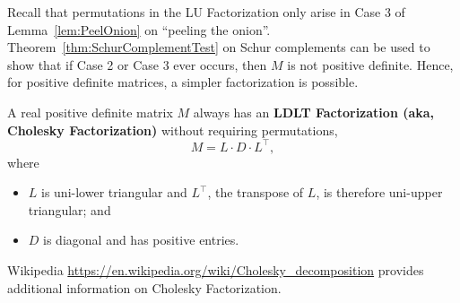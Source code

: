 \begin{rem} Recall that permutations in the LU Factorization only arise in Case 3 of Lemma~\ref{lem:PeelOnion} on ``peeling the onion''. Theorem~\ref{thm:SchurComplementTest} on Schur complements can be used to show that if Case 2 or Case 3 ever occurs, then $M$ is not positive definite. Hence, for positive definite matrices, a simpler factorization is possible. 
\end{rem}

\begin{tcolorbox}[title=\textbf{ \large Factorization of Positive Definite Matrices}]
A real positive definite matrix $M$ always has an \textbf{LDLT Factorization (aka, Cholesky Factorization)} without requiring permutations,
\begin{equation}
    \label{eq:LDLTfactorization}
   M  = L\cdot D \cdot L^\top,
\end{equation}
where
\begin{itemize}
    \item $L$ is uni-lower triangular and $L^\top$, the transpose of $L$, is therefore uni-upper triangular; and
    \item $D$ is diagonal and has positive entries.
\end{itemize}

\end{tcolorbox}

\vspace*{.2cm}
Wikipedia \url{https://en.wikipedia.org/wiki/Cholesky_decomposition} provides additional information on Cholesky Factorization.